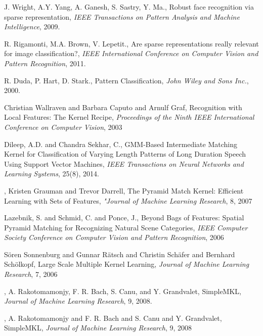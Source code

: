 \documentclass{article}
\begin{document}
\begin{thebibliography}{100}
J. Wright, A.Y. Yang, A. Ganesh, S. Sastry, Y. Ma., 
Robust face recognition via sparse representation, 
\emph{IEEE Transactions on Pattern Analysis and Machine Intelligence}, 2009. 

R. Rigamonti, M.A. Brown, V. Lepetit., 
Are sparse representations really relevant for image classification?, 
\emph{IEEE International Conference on Computer Vision and Pattern Recognition},
2011. 

R. Duda, P. Hart, D. Stark., Pattern Classification, 
\emph{John Wiley and Sons Inc.}, 2000. 





Christian Wallraven and Barbara Caputo and Arnulf Graf,
Recognition with Local Features: The Kernel Recipe,
\emph{Proceedings of the Ninth IEEE International Conference on Computer Vision},
2003


Dileep, A.D. and Chandra Sekhar, C., 
{GMM}-Based Intermediate Matching Kernel for Classification of Varying Length 
Patterns of Long Duration Speech Using Support Vector Machines, 
\emph{IEEE Transactions on Neural Networks and Learning Systems}, 25(8),
2014. 

,
Kristen Grauman and Trevor Darrell,
The Pyramid Match Kernel: Efficient Learning with Sets of Features,
\emph{"Journal of Machine Learning Research},
8, 2007

Lazebnik, S. and Schmid, C. and Ponce, J.,
Beyond Bags of Features: Spatial Pyramid Matching for Recognizing Natural Scene Categories, 
\emph{IEEE Computer Society Conference on Computer Vision and Pattern Recognition}, 
2006


S\"{o}ren Sonnenburg and Gunnar R\"{a}tsch and Christin Sch\"{a}fer and Bernhard Sch\"{o}lkopf,
Large Scale Multiple Kernel Learning,
\emph{Journal of Machine Learning Research},
 7, 2006

,
A. Rakotomamonjy, F. R. Bach, S. Canu, and Y. Grandvalet, 
SimpleMKL,
\emph{Journal of Machine Learning Research}, 
9, 2008.

,
A. Rakotomamonjy and F. R. Bach and S. Canu and Y. Grandvalet,
Simple{MKL},
\emph{Journal of Machine Learning Research},
 9, 2008













\end{thebibliography}
\end{document}
